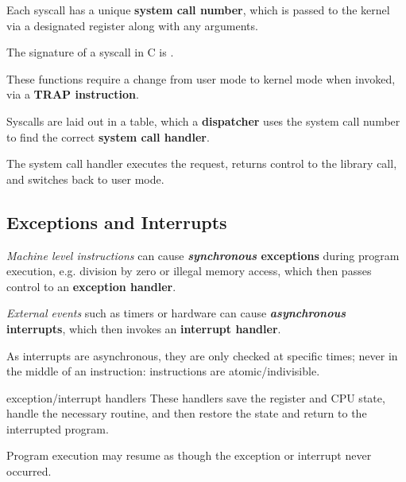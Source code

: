 Each syscall has a unique \textbf{system call number}, which is passed to the kernel via a designated register along with any arguments.

The signature of a syscall in C is .

These functions require a change from user mode to kernel mode when invoked, via a \textbf{TRAP instruction}.

Syscalls are laid out in a table, which a \textbf{dispatcher} uses the system call number to find the correct \textbf{system call handler}.

The system call handler executes the request, returns control to the library call, and switches back to user mode.

\subsection{Exceptions and Interrupts}
\textit{Machine level instructions} can cause \textbf{\textit{synchronous} exceptions} during program execution, e.g. division by zero or illegal memory access, which then passes control to an \textbf{exception handler}.

\textit{External events} such as timers or hardware can cause \textbf{\textit{asynchronous} interrupts}, which then invokes an \textbf{interrupt handler}.

As interrupts are asynchronous, they are only checked at specific times; never in the middle of an instruction: instructions are atomic/indivisible.

\begin{defn}{exception/interrupt handlers}
    These handlers save the register and CPU state, handle the necessary routine, and then restore the state and return to the interrupted program.

    Program execution may resume as though the exception or interrupt never occurred.
\end{defn}